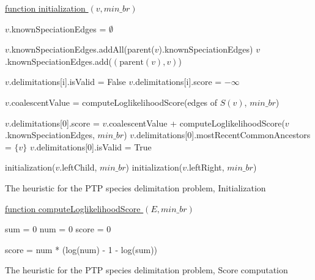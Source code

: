 \documentclass{llncs}
\begin{document}
\begin{algorithm}


\underline{function initialization $(v, min\_br)$}\

$v$.knownSpeciationEdges = $\emptyset$\;

 {
	$v$.knownSpeciationEdges.addAll(parent($v$).knownSpeciationEdges)\;
	$v$.knownSpeciationEdges.add($(\text{parent}(v),v)$)\;
}

 {
	$v$.delimitations[i].isValid = False\;
	$v$.delimitations[i].score = $- \infty$\;
}

$v$.coalescentValue = computeLoglikelihoodScore(edges of $S(v)$, $min\_br$)\;

$v$.delimitations[0].score = $v$.coalescentValue + computeLoglikelihoodScore($v$.knownSpeciationEdges, $min\_br$)\;
$v$.delimitations[0].mostRecentCommonAncestors = $\{v\}$\;
$v$.delimitations[0].isValid = True\;

 {
	initialization($v$.leftChild, $min\_br$)\;
}
 {
	initialization($v$.leftRight, $min\_br$)\;
}
\Return{}

\caption{The heuristic for the PTP species delimitation problem, Initialization}

\end{algorithm}

\begin{algorithm}


\underline{function computeLoglikelihoodScore $(E, min\_br)$}\

sum = 0\;
num = 0\;
score = 0\;


 {
	score = num * (log(num) - 1 - log(sum))\;
}


\caption{The heuristic for the PTP species delimitation problem, Score computation}

\end{algorithm}
\end{document}
